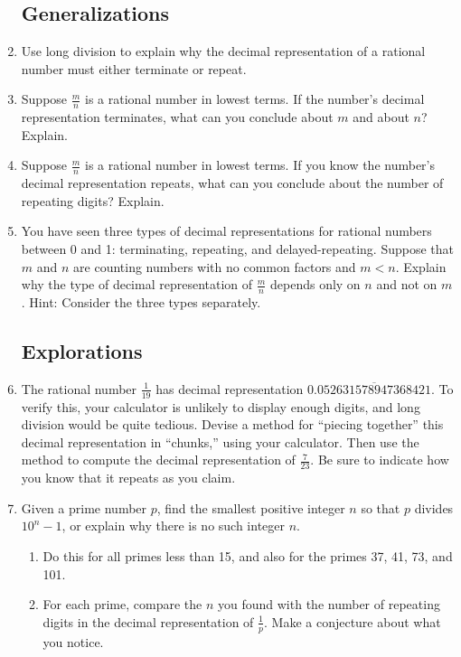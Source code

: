 \begin{problems}
\begin{enumerate}
\subsection*{Generalizations}
\item Use long division to explain why the decimal representation of a rational number must either terminate or repeat.

\item Suppose $\frac{m}{n}$ is a rational number in lowest terms.  If the number's decimal representation terminates, what can you conclude about $m$ and about $n$?  Explain.  

\item Suppose $\frac{m}{n}$ is a rational number in lowest terms.  If you know the number's decimal representation repeats, what can you conclude about the number of repeating digits?  Explain.  

\item You have seen three types of decimal representations for rational numbers between 0 and 1:  terminating, repeating, and delayed-repeating.  Suppose that $m$ and $n$ are counting numbers with no common factors and $m<n$.  Explain why the type of decimal representation of $\frac{m}{n}$ depends only on $n$ and not on $m$.  Hint:  Consider the three types separately.  

\subsection*{Explorations}

\item The rational number $\frac{1}{19}$ has decimal representation $0.\overline{052631578947368421}$.  To verify this, your calculator is unlikely to display enough digits, and long division would be quite tedious.  Devise a method for ``piecing together'' this decimal representation in ``chunks,'' using your calculator.  Then use the method to compute the decimal representation of $\frac{7}{23}$.  Be sure to indicate how you know that it repeats as you claim.  

\item Given a prime number $p$, find the smallest positive integer $n$ so that $p$ divides $10^n-1$, or explain why there is no such integer $n$.  
\begin{enumerate}
\item Do this for all primes less than 15, and also for the primes 37, 41, 73, and 101.
\item For each prime, compare the $n$ you found with the number of repeating digits in the decimal representation of $\frac{1}{p}$.  
Make a conjecture about what you notice.  
\end{enumerate}


\end{enumerate}
\end{problems}
